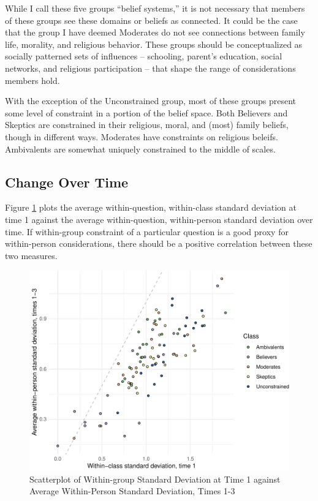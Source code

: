 \documentclass[12pt,]{article}
\begin{document}
While I call these five groups ``belief systems,'' it is not necessary that members of these groups see these domains or beliefs as connected. It could be the case that the group I have deemed Moderates do not see connections between family life, morality, and religious behavior. These groups should be conceptualized as socially patterned sets of influences -- schooling, parent's education, social networks, and religious participation -- that shape the range of considerations members hold.

With the exception of the Unconstrained group, most of these groups present some level of constraint in a portion of the belief space. Both Believers and Skeptics are constrained in their religious, moral, and (most) family beliefs, though in different ways. Moderates have constraints on religious beleifs. Ambivalents are somewhat uniquely constrained to the middle of scales.

\hypertarget{change-over-time-1}{%
\subsection{Change Over Time}\label{change-over-time-1}}

Figure \ref{fig:standardeviation} plots the average within-question, within-class standard deviation at time 1 against the average within-question, within-person standard deviation over time. If within-group constraint of a particular question is a good proxy for within-person considerations, there should be a positive correlation between these two measures.

\begin{figure}

{\centering \includegraphics{rethinking_constraint_revision_files/figure-latex/standardeviation-1} 

}

\caption{Scatterplot of Within-group Standard Deviation at Time 1 against Average Within-Person Standard Deviation, Times 1-3 }\label{fig:standardeviation}
\end{figure}
\end{document}
